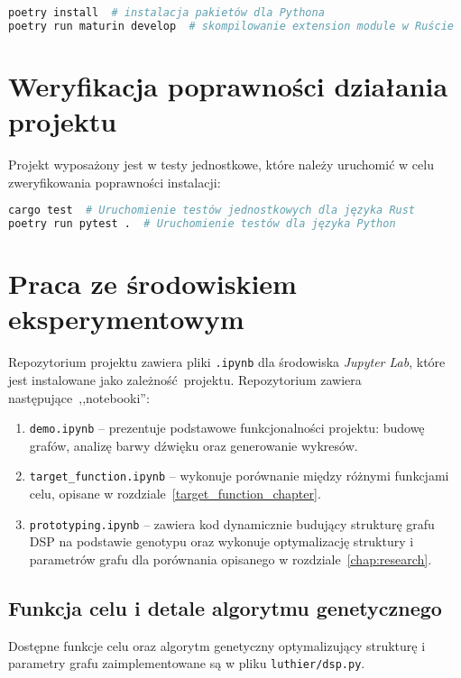 \begin{lstlisting}[language=Bash]
poetry install  # instalacja pakietów dla Pythona
poetry run maturin develop  # skompilowanie extension module w Ruście
\end{lstlisting}

\section{Weryfikacja poprawności działania projektu}

Projekt wyposażony jest w testy jednostkowe, które należy uruchomić w celu
zweryfikowania poprawności instalacji:

\begin{lstlisting}[language=Bash]
cargo test  # Uruchomienie testów jednostkowych dla języka Rust
poetry run pytest .  # Uruchomienie testów dla języka Python
\end{lstlisting}


\section{Praca ze środowiskiem eksperymentowym}

Repozytorium projektu zawiera pliki \texttt{.ipynb}
dla środowiska \textit{Jupyter Lab}, które
jest instalowane jako zależność projektu. Repozytorium
zawiera następujące~,,notebooki'':

\begin{enumerate}
  \item \texttt{demo.ipynb} -- prezentuje podstawowe funkcjonalności projektu: 
    budowę grafów, analizę barwy dźwięku oraz generowanie wykresów.
  \item \texttt{target\_function.ipynb} -- wykonuje porównanie między różnymi
    funkcjami celu, opisane w rozdziale~\ref{target_function_chapter}.
  \item \texttt{prototyping.ipynb} -- zawiera kod dynamicznie budujący strukturę
    grafu DSP na podstawie genotypu oraz wykonuje optymalizację struktury i
    parametrów grafu dla porównania opisanego w rozdziale~\ref{chap:research}.
\end{enumerate}


\subsection{Funkcja celu i detale algorytmu genetycznego}

Dostępne funkcje celu oraz algorytm genetyczny optymalizujący strukturę
i parametry grafu zaimplementowane są w pliku \texttt{luthier/dsp.py}.

